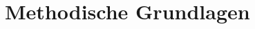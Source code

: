 
\chapter{Methodische Grundlagen}
\label{chapter:methodik}



\begin{otherlanguage}{american}







\end{otherlanguage}
